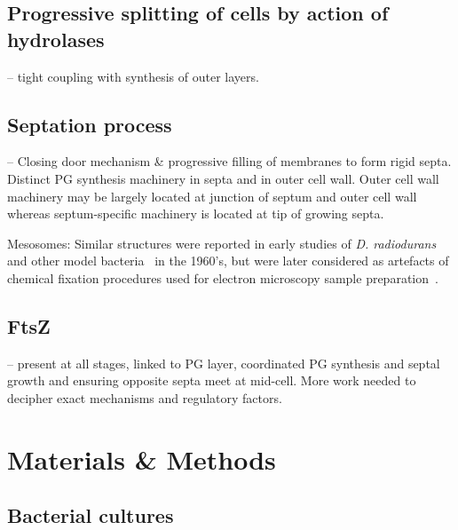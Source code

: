 \subsection{Progressive splitting of cells by action of hydrolases} -- tight coupling with synthesis of outer layers.

\subsection{Septation process} -- Closing door mechanism \& progressive filling of membranes to form rigid septa.
Distinct PG synthesis machinery in septa and in outer cell wall.
Outer cell wall machinery may be largely located at junction of septum and outer cell wall whereas septum-specific machinery is located at tip of growing septa.

Mesosomes: Similar structures were reported in early studies of \textit{D. radiodurans}~\cite{thornleyFineStructureMicrococcus1965,sleytrStudyFreezeetchingFine1973} and other model bacteria~\cite{suganumaStudiesFineStructure1966,pontefractMesosomesEscherichiaColi1969} in the 1960's, but were later considered as artefacts of chemical fixation procedures used for electron microscopy sample preparation~\cite{ryterContributionNewCryomethods1988,dubochetElectronMicroscopyFrozenhydrated1983,liedtkeHowAdvancesCryoelectron2022}.

\subsection{FtsZ} -- present at all stages, linked to PG layer, coordinated PG synthesis and septal growth and ensuring opposite septa meet at mid-cell.
More work needed to decipher exact mechanisms and regulatory factors.

\section{Materials \& Methods}

\subsection{Bacterial cultures}

